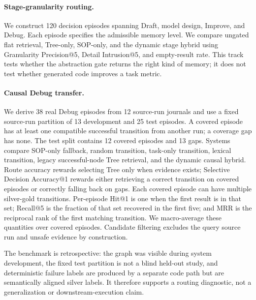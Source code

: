 \documentclass{article}
\begin{document}
\paragraph{Stage-granularity routing.}
We construct 120 decision episodes spanning Draft, model design, Improve, and
Debug.  Each episode specifies the admissible memory level.  We compare ungated
flat retrieval, Tree-only, SOP-only, and the dynamic stage hybrid using
Granularity Precision@5, Detail Intrusion@5, and empty-result rate.  This track
tests whether the abstraction gate returns the right kind of memory; it does not
test whether generated code improves a task metric.

\paragraph{Causal Debug transfer.}
We derive 38 real Debug episodes from 12 source-run journals and use a fixed
source-run partition of 13 development and 25 test episodes.  A covered episode
has at least one compatible successful transition from another run; a coverage
gap has none.  The test split contains 12 covered episodes and 13 gaps.  Systems
compare SOP-only fallback, random transition, task-only transition, lexical
transition, legacy successful-node Tree retrieval, and the dynamic causal
hybrid.  Route accuracy rewards selecting Tree only when evidence exists;
Selective Decision Accuracy@1 rewards either retrieving a correct transition on
covered episodes or correctly falling back on gaps.  Each covered episode can
have multiple silver-gold transitions.  Per-episode Hit@1 is one when the first
result is in that set; Recall@5 is the fraction of that set recovered in the
first five; and MRR is the reciprocal rank of the first matching transition.
We macro-average these quantities over covered episodes.  Candidate filtering
excludes the query source run and unsafe evidence by construction.

The benchmark is retrospective: the graph was visible during system development,
the fixed test partition is not a blind held-out study, and deterministic failure
labels are produced by a separate code path but are semantically aligned silver
labels.  It therefore supports a routing diagnostic, not a generalization or
downstream-execution claim.
\end{document}

